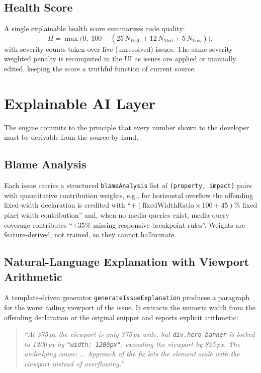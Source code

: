 \documentclass[conference]{IEEEtran}
\begin{document}
\subsection{Health Score}
A single explainable health score summarizes code quality:
\begin{equation}
  H = \max\!\bigl(0,\; 100 - (25\,N_{\text{High}} + 12\,N_{\text{Med}} +
  5\,N_{\text{Low}})\bigr),
\label{eq:health}
\end{equation}
with severity counts taken over live (unresolved) issues. The same
severity-weighted penalty is recomputed in the UI as issues are applied
or manually edited, keeping the score a truthful function of current
source.

\section{Explainable AI Layer}

The engine commits to the principle that every number shown to the
developer must be derivable from the source by hand.

\subsection{Blame Analysis}
Each issue carries a structured \texttt{blameAnalysis} list of
\texttt{(property, impact)} pairs with quantitative contribution weights,
e.g., for horizontal overflow the offending fixed-width declaration is
credited with ``$+(\text{fixedWidthRatio}\times100+45)\%$ fixed pixel
width contribution'' and, when no media queries exist, media-query
coverage contributes ``$+35\%$ missing responsive breakpoint rules''.
Weights are feature-derived, not trained, so they cannot hallucinate.

\subsection{Natural-Language Explanation with Viewport Arithmetic}
A template-driven generator \texttt{generateIssueExplanation} produces a
paragraph for the worst failing viewport of the issue. It extracts the
numeric width from the offending declaration or the original snippet and
reports explicit arithmetic:

\begin{quote}
\small\itshape
``At 375\,px the viewport is only 375\,px wide, but
\texttt{div.hero-banner} is locked to 1200\,px by \texttt{"width:
1200px"}, exceeding the viewport by 825\,px. The underlying cause:
\ldots{}
Approach of the fix lets the element scale with the viewport instead of
overflowing.''
\end{quote}
\end{document}
